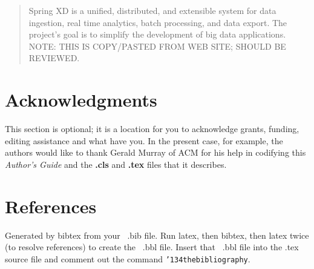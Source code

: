 \documentclass{acm_proc_article-sp}
\begin{document}
\maketitle
\begin{abstract}
Spring XD is a unified, distributed, and extensible system for data ingestion, real time analytics, batch processing, and data export. The project's goal is to simplify the development of big data applications.
NOTE: THIS IS COPY/PASTED FROM WEB SITE; SHOULD BE REVIEWED.
\end{abstract}
















\section{Acknowledgments}
This section is optional; it is a location for you
to acknowledge grants, funding, editing assistance and
what have you.  In the present case, for example, the
authors would like to thank Gerald Murray of ACM for
his help in codifying this \textit{Author's Guide}
and the \textbf{.cls} and \textbf{.tex} files that it describes.

%

%
%
\section{References}
Generated by bibtex from your ~.bib file.  Run latex,
then bibtex, then latex twice (to resolve references)
to create the ~.bbl file.  Insert that ~.bbl file into
the .tex source file and comment out
the command \texttt{{\char'134}thebibliography}.
\balancecolumns
\end{document}
